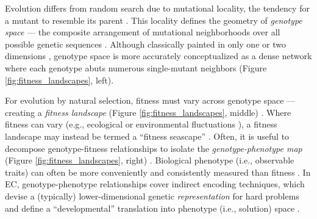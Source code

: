 Evolution differs from random search due to mutational locality, the tendency for a mutant to resemble its parent \citep{maynardsmith1970natural,galvanlopez2011defining,ashlock2012representation,back1996evolutionary,foster2001evolutionary,richter2014fitness}.
This locality defines the geometry of \textit{genotype space} --- the composite arrangement of mutational neighborhoods over all possible genetic sequences \citep{fragata2019evolution,castle2021towards}.
Although classically painted in only one or two dimensions \citep{mcleish2015there,greenbury2022structure,gordon1994evolution,gavrilets1997evolution}, genotype space is more accurately conceptualized as a dense network where each genotype abuts numerous single-mutant neighbors (Figure \ref{fig:fitness_landscapes}, left).

For evolution by natural selection, fitness must vary across genotype space --- creating a \textit{fitness landscape} (Figure \ref{fig:fitness_landscapes}, middle) \citep{pitzer2012comprehensive}.
Where fitness can vary (e.g., ecological or environmental fluctuations \citep{olson2014dynamic,kaplan2008end,dolson2021digital}), a fitness landscape may instead be termed a ``fitness seascape'' \citep{cairns2022strong,mustonen2009fitness}.
Often, it is useful to decompose genotype-fitness relationships to isolate the \textit{genotype-phenotype map} (Figure \ref{fig:fitness_landscapes}, right) \citep{ahnert2017structural,aguilar2018architecture,stadler2003landscapes}.
Biological phenotype (i.e., observable traits) can often be more conveniently and consistently measured than fitness \citep{chen2022environmental,ahnert2017structural,wagner2011pleiotropic,aguilar2018architecture}.
In EC, genotype-phenotype relationships cover indirect encoding techniques, which devise a (typically) lower-dimensional genetic \textit{representation} for hard problems \citep{ashlock2012representation,rothlauf2003redundant,rothlauf2009representations,mitavskiy2003comparing} and define a ``developmental'' translation into phenotype (i.e., solution) space \citep{stanley2007compositional,stanley2003taxonomy,stanley2009hypercubebased,clune2011performance,kitano1990designing,hornby2002creating}.

